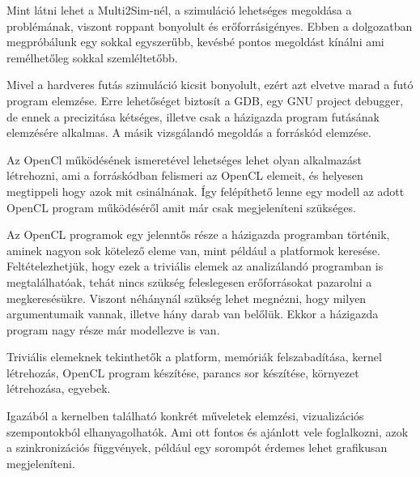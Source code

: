 
Mint látni lehet a Multi2Sim-nél, a szimuláció lehetséges megoldása a problémának, viszont roppant bonyolult és erőforrásigényes. Ebben a dolgozatban megpróbálunk egy sokkal egyszerűbb, kevésbé pontos megoldást kínálni ami remélhetőleg sokkal szemléltetőbb. 

Mivel a hardveres futás szimuláció kicsit bonyolult, ezért azt elvetve marad a futó program elemzése. Erre lehetőséget biztosít a GDB, egy GNU project debugger, de ennek a precizitása kétséges, illetve csak a házigazda program futásának elemzésére alkalmas. A másik vizsgálandó megoldás a forráskód elemzése.

 Az OpenCl működésének ismeretével lehetséges lehet olyan alkalmazást létrehozni, ami a forráskódban felismeri az OpenCL elemeit, és helyesen megtippeli hogy azok mit csinálnának. Így felépíthető lenne egy modell az adott OpenCL program működéséről amit már csak megjeleníteni szükséges.
 
Az OpenCL programok egy jelenntős része a házigazda programban történik, aminek nagyon sok kötelező eleme van, mint például a platformok keresése. Feltételezhetjük, hogy ezek a triviális elemek az analizálandó programban is megtalálhatóak, tehát nincs szükség feleslegesen erőforrásokat pazarolni a megkeresésükre. Viszont néhánynál szükség lehet megnézni, hogy milyen argumentumaik vannak, illetve hány darab van belőlük. Ekkor a házigazda program nagy része már modellezve is van.

Triviális elemeknek tekinthetők a platform, memóriák felszabadítása, kernel létrehozás, OpenCL program készítése, parancs sor készítése, környezet létrehozása, egyebek.



Igazából a kernelben található konkrét műveletek elemzési, vizualizációs szempontokból elhanyagolhatók. Ami ott fontos és ajánlott vele foglalkozni, azok a szinkronizációs függvények, például egy sorompót érdemes lehet grafikusan megjeleníteni.


